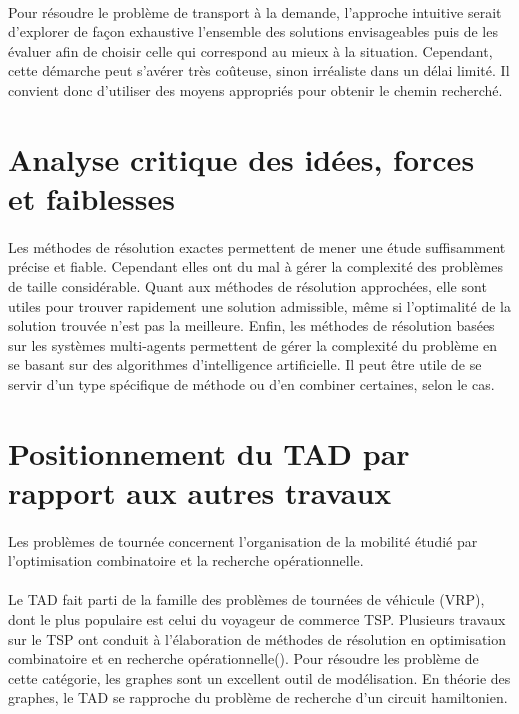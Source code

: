 \documentclass{article}
\begin{document}
\paragraph{}
Pour résoudre le problème de transport à la demande, l'approche intuitive serait d'explorer de façon exhaustive l'ensemble des solutions envisageables puis de les évaluer afin de choisir celle qui correspond au mieux à la situation. Cependant, cette démarche peut s'avérer très coûteuse, sinon irréaliste dans un délai limité. Il convient donc d'utiliser des moyens appropriés pour obtenir le chemin recherché.


\section{Analyse critique des idées, forces et faiblesses}

\paragraph{}
Les méthodes de résolution exactes permettent de mener une étude suffisamment précise et fiable. Cependant elles ont du mal à gérer la complexité des problèmes de taille considérable. Quant aux méthodes de résolution approchées, elle sont utiles pour trouver rapidement une solution admissible, même si l'optimalité de la solution trouvée n'est pas la meilleure. Enfin, les méthodes de résolution basées sur les systèmes multi-agents permettent de gérer la complexité du problème en se basant sur des algorithmes d'intelligence artificielle. Il peut être utile de se servir d'un type spécifique de méthode ou d'en combiner certaines, selon le cas.

\section{Positionnement du TAD par rapport aux autres travaux}

\paragraph{}
Les problèmes de tournée concernent l'organisation de la mobilité étudié par l'optimisation combinatoire et la recherche opérationnelle.

\paragraph{}
Le TAD fait parti de la famille des problèmes de tournées de véhicule (VRP), dont le plus populaire est celui du voyageur de commerce TSP. Plusieurs travaux sur le TSP ont conduit à l'élaboration de méthodes de résolution en optimisation combinatoire et en recherche opérationnelle(\cite{Nobody06}). Pour résoudre les problème de cette catégorie, les graphes sont un excellent outil de modélisation. En théorie des graphes, le TAD se rapproche du problème de recherche d'un circuit hamiltonien.
\end{document}
